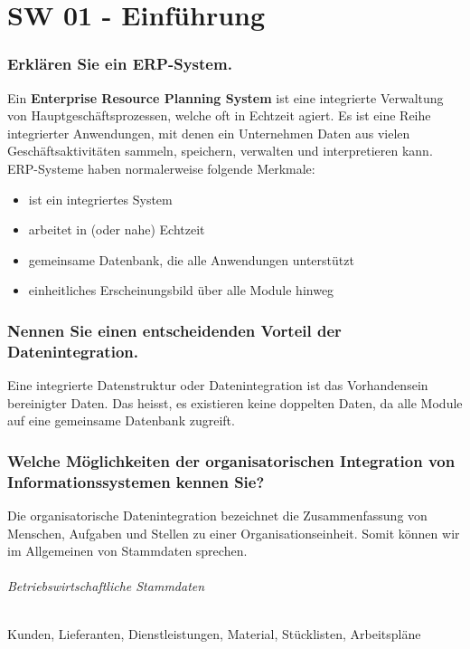 \part{SW 01 - Einführung}\label{part:sw01}
\section{Erklären Sie ein ERP-System.}
Ein \textbf{Enterprise Resource Planning System} ist eine integrierte Verwaltung von Hauptgeschäftsprozessen, welche oft in Echtzeit agiert. Es ist eine Reihe integrierter Anwendungen, mit denen ein Unternehmen Daten aus vielen Geschäftsaktivitäten sammeln, speichern, verwalten und interpretieren kann.\\
ERP-Systeme haben normalerweise folgende Merkmale:
\begin{itemize}
    \item ist ein integriertes System
    \item arbeitet in (oder nahe) Echtzeit
    \item gemeinsame Datenbank, die alle Anwendungen unterstützt
    \item einheitliches Erscheinungsbild über alle Module hinweg
\end{itemize}

\section{Nennen Sie einen entscheidenden Vorteil der Datenintegration.}
Eine integrierte Datenstruktur oder Datenintegration ist das Vorhandensein bereinigter Daten. Das heisst, es existieren keine doppelten Daten, da alle Module auf eine gemeinsame Datenbank zugreift.

\section{Welche Möglichkeiten der organisatorischen Integration von Informationssystemen kennen Sie?}
Die organisatorische Datenintegration bezeichnet die Zusammenfassung von Menschen, Aufgaben und Stellen zu einer Organisationseinheit. Somit können wir im Allgemeinen von Stammdaten sprechen.
\paragraph{Betriebswirtschaftliche Stammdaten} Kunden, Lieferanten, Dienstleistungen, Material, Stücklisten, Arbeitspläne
